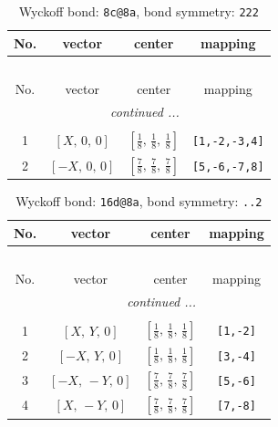 \documentclass[fleqn,8pt]{jsarticle}
\begin{document}
\renewcommand{\arraystretch}{1.2}
\begin{longtable}{cccc}
\caption{Wyckoff bond: {\tt 8c@8a}, bond symmetry: {\tt 222}}
 \\
 \hline \hline
No. & vector & center & mapping \\ \hline \endfirsthead

\multicolumn{3}{l}{\tablename\ \thetable{}} \\
 \hline \hline
No. & vector & center & mapping \\ \hline \endhead

 \hline \hline
\multicolumn{3}{r}{\footnotesize\it continued ...} \\ \endfoot

 \hline \hline
\multicolumn{3}{r}{} \\ \endlastfoot

1 & $\left[ X,\, 0,\, 0 \right]$ & $\left[ \frac{1}{8},\, \frac{1}{8},\, \frac{1}{8} \right]$ & {\tt [1,-2,-3,4]} \\ \hline
2 & $\left[ - X,\, 0,\, 0 \right]$ & $\left[ \frac{7}{8},\, \frac{7}{8},\, \frac{7}{8} \right]$ & {\tt [5,-6,-7,8]} \\
\end{longtable}
\renewcommand{\arraystretch}{1.2}
\begin{longtable}{cccc}
\caption{Wyckoff bond: {\tt 16d@8a}, bond symmetry: {\tt ..2}}
 \\
 \hline \hline
No. & vector & center & mapping \\ \hline \endfirsthead

\multicolumn{3}{l}{\tablename\ \thetable{}} \\
 \hline \hline
No. & vector & center & mapping \\ \hline \endhead

 \hline \hline
\multicolumn{3}{r}{\footnotesize\it continued ...} \\ \endfoot

 \hline \hline
\multicolumn{3}{r}{} \\ \endlastfoot

1 & $\left[ X,\, Y,\, 0 \right]$ & $\left[ \frac{1}{8},\, \frac{1}{8},\, \frac{1}{8} \right]$ & {\tt [1,-2]} \\ \hline
2 & $\left[ - X,\, Y,\, 0 \right]$ & $\left[ \frac{1}{8},\, \frac{1}{8},\, \frac{1}{8} \right]$ & {\tt [3,-4]} \\ \hline
3 & $\left[ - X,\, - Y,\, 0 \right]$ & $\left[ \frac{7}{8},\, \frac{7}{8},\, \frac{7}{8} \right]$ & {\tt [5,-6]} \\ \hline
4 & $\left[ X,\, - Y,\, 0 \right]$ & $\left[ \frac{7}{8},\, \frac{7}{8},\, \frac{7}{8} \right]$ & {\tt [7,-8]} \\
\end{longtable}
\end{document}
